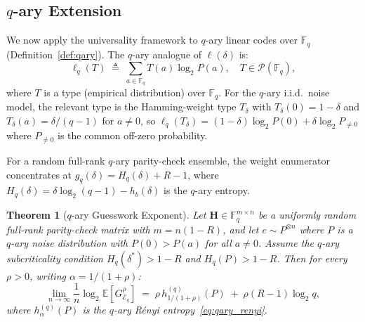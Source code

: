 \documentclass[journal,10pt,onecolumn]{IEEEtran}
\newtheorem{theorem}{Theorem}
\newcommand{\Eb}{\mathbb{E}}
\newcommand{\Hb}{h_b}
\newcommand{\Hm}{\mathbf{H}}
\begin{document}
\subsection{$q$-ary Extension}

We now apply the universality framework to $q$-ary linear codes
over $\mathbb{F}_q$ (Definition~\ref{def:qary}).
The $q$-ary analogue of $\ell(\delta)$ is:
\begin{equation}
    \ell_q(T)
    \;\triangleq\;
    \sum_{a\in\mathbb{F}_q} T(a)\log_2 P(a),
    \quad T\in\mathcal{P}(\mathbb{F}_q),
    \label{eq:ell_q}
\end{equation}
where $T$ is a type (empirical distribution) over $\mathbb{F}_q$.
For the $q$-ary i.i.d.\ noise model, the relevant type is the
Hamming-weight type $T_\delta$ with $T_\delta(0)=1-\delta$ and
$T_\delta(a)=\delta/(q-1)$ for $a\ne 0$, so
$\ell_q(T_\delta)=(1-\delta)\log_2 P(0)+\delta\log_2 P_{\ne 0}$
where $P_{\ne 0}$ is the common off-zero probability.

For a random full-rank $q$-ary parity-check ensemble, the weight
enumerator concentrates at $g_q(\delta)=H_q(\delta)+R-1$, where
$H_q(\delta)=\delta\log_2(q-1)-\Hb(\delta)$ is the $q$-ary entropy.

\begin{theorem}[$q$-ary Guesswork Exponent]
\label{thm:qary}
Let $\Hm\in\mathbb{F}_q^{m\times n}$ be a uniformly random
full-rank parity-check matrix with $m=n(1-R)$, and let
$e\sim P^{\otimes n}$ where $P$ is a $q$-ary noise distribution
with $P(0)>P(a)$ for all $a\ne 0$.
Assume the $q$-ary subcriticality condition
$H_q(\delta^*)>1-R$ and $H_q(P)>1-R$.
Then for every $\rho>0$, writing $\alpha=1/(1+\rho)$:
\begin{equation}
    \lim_{n\to\infty}
    \frac{1}{n}\log_2\Eb\!\left[G_{\mathcal{E}_q}^{\rho}\right]
    \;=\;
    \rho\,h^{(q)}_{1/(1+\rho)}(P)\;+\;\rho(R-1)\log_2 q,
    \label{eq:qary_exponent}
\end{equation}
where $h^{(q)}_\alpha(P)$ is the $q$-ary R\'{e}nyi entropy~\eqref{eq:qary_renyi}.
\end{theorem}
\end{document}
